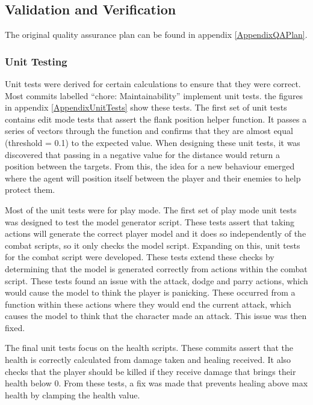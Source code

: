\documentclass{IEEEtran}
\begin{document}
\subsection{Validation and Verification}
\label{Validation}

The original quality assurance plan can be found in appendix \ref{AppendixQAPlan}.

\subsubsection{Unit Testing}

Unit tests were derived for certain calculations to ensure that they were correct. Most commits labelled “chore: Maintainability” implement unit tests. the figures in appendix \ref{AppendixUnitTests} show these tests. The first set of unit tests contains edit mode tests that assert the flank position helper function. It passes a series of vectors through the function and confirms that they are almost equal (threshold = 0.1) to the expected value. When designing these unit tests, it was discovered that passing in a negative value for the distance would return a position between the targets. From this, the idea for a new behaviour emerged where the agent will position itself between the player and their enemies to help protect them.

Most of the unit tests were for play mode. The first set of play mode unit tests was designed to test the model generator script. These tests assert that taking actions will generate the correct player model and it does so independently of the combat scripts, so it only checks the model script. Expanding on this, unit tests for the combat script were developed. These tests extend these checks by determining that the model is generated correctly from actions within the combat script. These tests found an issue with the attack, dodge and parry actions, which would cause the model to think the player is panicking. These occurred from a function within these actions where they would end the current attack, which causes the model to think that the character made an attack. This issue was then fixed.

The final unit tests focus on the health scripts. These commits assert that the health is correctly calculated from damage taken and healing received. It also checks that the player should be killed if they receive damage that brings their health below 0. From these tests, a fix was made that prevents healing above max health by clamping the health value.
\end{document}

